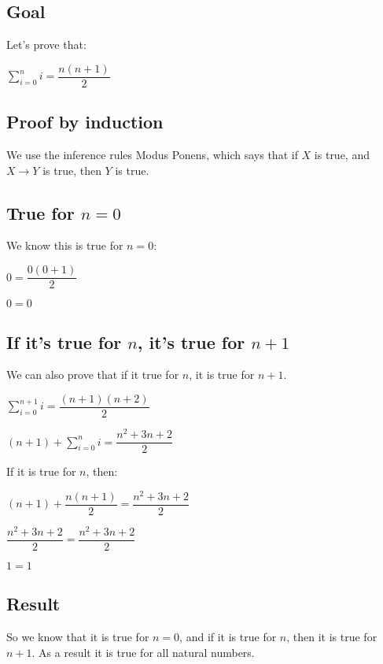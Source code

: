 
\subsection{Goal}

Let's prove that:

\(\sum_{i=0}^n i= \dfrac{n(n+1)}{2}\)

\subsection{Proof by induction}

We use the inference rules Modus Ponens, which says that if \(X\) is true, and \(X\rightarrow Y\) is true, then \(Y\) is true.

\subsection{True for \(n=0\)}

We know this is true for \(n=0\):

\(0=\dfrac{0(0+1)}{2}\)

\(0=0\)

\subsection{If it's true for \(n\), it's true for \(n+1\)}

We can also prove that if it true for \(n\), it is true for \(n+1\).

\(\sum_{i=0}^{n+1} i= \dfrac{(n+1)(n+2)}{2}\)

\((n+1)+\sum_{i=0}^{n} i= \dfrac{n^2 +3n +2}{2}\)

If it is true for \(n\), then:

\((n+1)+\dfrac{n(n+1)}{2}= \dfrac{n^2 +3n +2}{2}\)

\(\dfrac{n^2+3n+2}{2}= \dfrac{n^2 +3n +2}{2}\)

\(1=1\)

\subsection{Result}

So we know that it is true for \(n=0\), and if it is true for \(n\), then it is true for \(n+1\). As a result it is true for all natural numbers.

